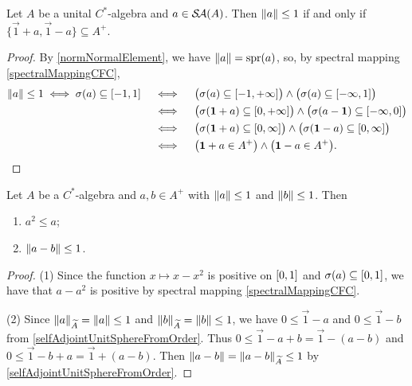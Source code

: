 \begin{lemma} \label{selfAdjointUnitSphereFromOrder}
Let $A$ be a unital $C^*$-algebra and $a\in \mathop{\mathcal{S}\hspace{-0.15em}\mathcal{A}}\nolimits(A)$. Then $\lVert a\rVert \leq 1$ \textup{if and only if} $\{\vec{1}+a, \vec{1}- a\} \subseteq A^+$. 
\end{lemma}
\begin{proof}
By \ref{normNormalElement}, we have $\lVert a\rVert = \operatorname{spr}(a)$, so, by spectral mapping \ref{spectralMappingCFC},
\begin{align*}
\norm{a}\leq 1 \iff \spec(a) \subseteq \interval{-1,1} \quad&\iff\quad \big(\spec(a) \subseteq \interval{-1,+\infty}\big) \land \big(\spec(a) \subseteq \interval{-\infty,1}\big) \\
&\iff \quad \big(\spec(\vec{1} + a) \subseteq \interval{0,+\infty}\big) \land \big(\spec(a - \vec{1}) \subseteq \interval{-\infty,0}\big) \\
&\iff \quad \big(\spec(\vec{1} + a) \subseteq \interval{0,\infty}\big) \land \big(\spec(\vec{1}-a) \subseteq \interval{0, \infty}\big) \\
&\iff \quad \big(\vec{1} + a\in A^+\big) \land \big(\vec{1}-a\in A^+\big).
\end{align*}
\end{proof}

\begin{lemma} \label{orderSubUnitVectorLemma}
Let $A$ be a $C^*$-algebra and $a, b\in A^+$ with $\lVert a\rVert\leq 1$ and $\lVert b\rVert\leq 1$. Then
\begin{enumerate}
\item $a^2 \leq a$;
\item $\lVert a-b\rVert \leq 1$.
\end{enumerate}
\end{lemma}
\begin{proof}
(1) Since the function $x\mapsto x-x^2$ is positive on $\interval{0,1}$ and $\spec(a) \subseteq \interval{0,1}$, we have that $a - a^2$ is positive by spectral mapping \ref{spectralMappingCFC}.

(2) Since $\lVert a\rVert_{\widetilde{A}} = \lVert a\rVert \leq 1$ and $\lVert b\rVert_{\widetilde{A}} = \lVert b\rVert \leq 1$, we have $0\leq \vec{1}-a$ and $0\leq \vec{1}-b$ from \ref{selfAdjointUnitSphereFromOrder}. Thus $0\leq \vec{1}-a+b = \vec{1} - (a-b)$ and $0\leq \vec{1} -b +a = \vec{1}+ (a-b)$. Then $\lVert a-b\rVert = \lVert a-b\rVert_{\widetilde{A}} \leq 1$ by \ref{selfAdjointUnitSphereFromOrder}.
\end{proof}

